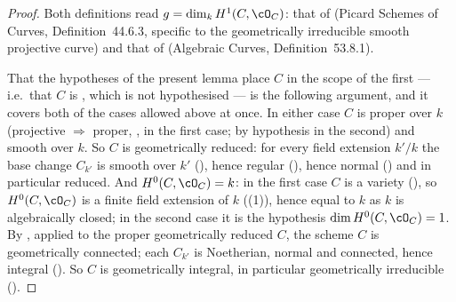 \begin{proof}
Both definitions read $g=\dim_kH^1(C,\cO_C)$: that of
 (Picard Schemes of Curves, Definition~44.6.3,
specific to the geometrically irreducible smooth projective curve) and
that of  (Algebraic Curves, Definition~53.8.1).

That the hypotheses of the present lemma place $C$ in the scope of the
first --- i.e.\ that $C$ is
,
which is not hypothesised --- is the following argument, and it covers
both of the cases allowed above at once.  In either case $C$ is proper
over $k$ (projective $\Rightarrow$ proper,
, in the first case; by hypothesis in the
second) and smooth over $k$.  So $C$ is geometrically reduced: for every
field extension $k'/k$ the base change $C_{k'}$ is smooth over $k'$
(), hence regular
(), hence normal
() and in particular reduced.  And
$H^0(C,\cO_C)=k$: in the first case $C$ is a variety
(), so $H^0(C,\cO_C)$ is a finite field extension of
$k$ ((1)), hence equal to $k$ as $k$ is
algebraically closed; in the second case it is the hypothesis
$\dim H^0(C,\cO_C)=1$.  By , applied to
the proper geometrically reduced $C$, the scheme $C$ is geometrically
connected; each $C_{k'}$ is Noetherian, normal and connected, hence
integral ().  So $C$ is
geometrically integral, in particular geometrically irreducible
().


\end{proof}
